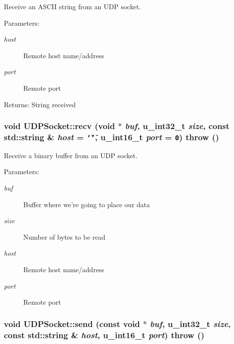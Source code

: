 Receive an ASCII string from an UDP socket. 

\begin{Desc}
\item[Parameters:]
\begin{description}
\item[{\em host}]Remote host name/address \item[{\em port}]Remote port \end{description}
\end{Desc}
\begin{Desc}
\item[Returns:]String received \end{Desc}
\hypertarget{classUDPSocket_5ee2f9411fad95d5bc7ebd3eecb7d86f}{
\subsubsection[{recv}]{\setlength{\rightskip}{0pt plus 5cm}void UDPSocket::recv (void $\ast$ {\em buf}, \/  u\_\-int32\_\-t {\em size}, \/  const std::string \& {\em host} = {\tt \char`\"{}\char`\"{}}, \/  u\_\-int16\_\-t {\em port} = {\tt 0})  throw ()}}
\label{classUDPSocket_5ee2f9411fad95d5bc7ebd3eecb7d86f}


Receive a binary buffer from an UDP socket. 

\begin{Desc}
\item[Parameters:]
\begin{description}
\item[{\em buf}]Buffer where we're going to place our data \item[{\em size}]Number of bytes to be read \item[{\em host}]Remote host name/address \item[{\em port}]Remote port \end{description}
\end{Desc}
\hypertarget{classUDPSocket_254a2df8f7205266cd684931e9914ba9}{
\subsubsection[{send}]{\setlength{\rightskip}{0pt plus 5cm}void UDPSocket::send (const void $\ast$ {\em buf}, \/  u\_\-int32\_\-t {\em size}, \/  const std::string \& {\em host}, \/  u\_\-int16\_\-t {\em port})  throw ()}}
\label{classUDPSocket_254a2df8f7205266cd684931e9914ba9}


